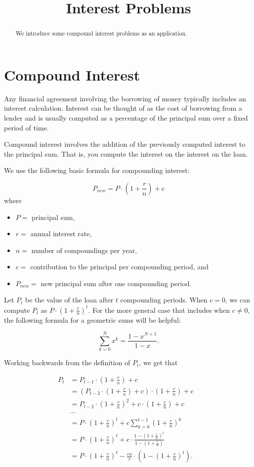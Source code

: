 \documentclass{ximera}
\title{Interest Problems}
\begin{document}
\begin{abstract}  
We introduce some compound interest problems as an application.
\end{abstract}  
\maketitle

\section{Compound Interest}

Any financial agreement involving the borrowing of money typically includes an interest calculation. Interest can be thought of as the cost of borrowing from a lender and is usually computed as a percentage of the principal sum over a fixed period of time.

Compound interest involves the addition of the previously computed interest to the principal sum. That is, you compute the interest on the interest on the loan.

We use the following basic formula for compounding interest:

$$P_{new} = P\cdot\left(1+\frac{r}{n}\right) + c $$ where
\begin{itemize}
	\item $P = $ principal sum,
	\item $r = $ annual interest rate,
	\item $n = $ number of compoundings per year,
	\item $c = $ contribution to the principal per compounding period, and 
	\item $P_{new} = $ new principal sum after one compounding period.
\end{itemize}

Let $P_t$ be the value of the loan after $t$ compounding periods. When $c=0$, we can compute $P_t$ as $P\cdot\left(1+\frac{r}{n}\right)^{t}$. For the more general case that includes when $c\neq 0$, the following formula for a geometric sums will be helpful:

$$\sum_{k=0}^Nx^k = \frac{1-x^{N+1}}{1-x}.$$

Working backwards from the definition of $P_t$, we get that

\begin{align*}
	P_t & = P_{t-1}\cdot\left(1+\frac{r}{n}\right) + c\\
	    & = \left(P_{t-2}\cdot\left(1+\frac{r}{n}\right) + c\right)\cdot\left(1+\frac{r}{n}\right) + c\\
	    & = P_{t-2}\cdot\left(1+\frac{r}{n}\right)^2 + c\cdot\left(1+\frac{r}{n}\right) + c\\
	    & \cdots & \\
	    & = P\cdot\left(1+\frac{r}{n}\right)^t + c\sum_{k=0}^{t-1}\left(1+\frac{r}{n}\right)^k\\
	    & = P\cdot\left(1+\frac{r}{n}\right)^t + c\cdot\frac{1-\left(1+\frac{r}{n}\right)^t}{1-\left(1+\frac{r}{n}\right)}\\
	    & = P\cdot\left(1+\frac{r}{n}\right)^t - \frac{cn}{r}\cdot\left(1-\left(1+\frac{r}{n}\right)^t\right).
\end{align*}
\end{document}
